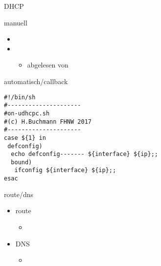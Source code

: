 \begin{frame}[fragile]{DHCP}
 \begin{block}{manuell}
  \begin{itemize}
   \item {}
   \item {}
   \begin{itemize}
    \item {} abgelesen von 
   \end{itemize}
  \end{itemize}
 \end{block}
 \begin{block}{automatisch/callback}
\vspace{-3mm}
{\tiny
\begin{verbatim}
#!/bin/sh
#---------------------
#on-udhcpc.sh
#(c) H.Buchmann FHNW 2017
#---------------------
case ${1} in
 defconfig)
  echo defconfig------- ${interface} ${ip};;
  bound)
   ifconfig ${interface} ${ip};;
esac
\end{verbatim}
}
\end{block}
\end{frame}

\begin{frame}{route/dns}
\begin{itemize}
 \item route
 \begin{itemize}
  \item {}
 \end{itemize}
 \item DNS
 \begin{itemize}
   \item {}
 \end{itemize}
\end{itemize}
\end{frame}

